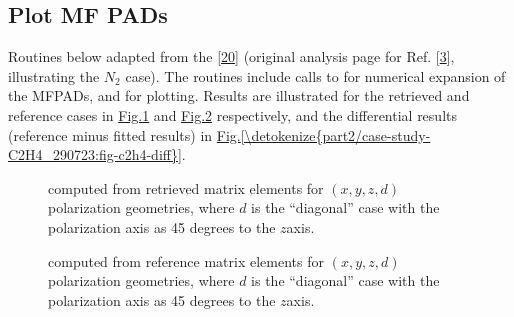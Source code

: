 \documentclass[letterpaper,table,10pt,english]{jupyterBook}
\begin{document}
\subsection{Plot MF PADs}
\label{\detokenize{part2/case-study-C2H4_290723:plot-mf-pads}}
\sphinxAtStartPar
Routines below adapted from the  {[}\hyperlink{cite.backmatter/bibliography:id681}{20}{]}  (original analysis page for Ref. {[}\hyperlink{cite.backmatter/bibliography:id686}{3}{]}, illustrating the \(N_2\) case). The routines include calls to  for numerical expansion of the MF\sphinxhyphen{}PADs, and  for plotting. Results are illustrated for the retrieved and reference cases in \hyperref[\detokenize{part2/case-study-C2H4_290723:fig-c2h4-compc}]{Fig.\@ \ref{\detokenize{part2/case-study-C2H4_290723:fig-c2h4-compc}}} and \hyperref[\detokenize{part2/case-study-C2H4_290723:fig-c2h4-ref}]{Fig.\@ \ref{\detokenize{part2/case-study-C2H4_290723:fig-c2h4-ref}}} respectively, and the differential results (reference minus fitted results) in \hyperref[\detokenize{part2/case-study-C2H4_290723:fig-c2h4-diff}]{Fig.\@ \ref{\detokenize{part2/case-study-C2H4_290723:fig-c2h4-diff}}}.

\begin{figure}[htbp]
\centering
\capstart

\noindent{}
\caption{{\hyperref[\detokenize{backmatter/glossary:term-MF}]{}} computed from retrieved matrix elements for \((x,y,z,d)\) polarization geometries, where \(d\) is the “diagonal” case with the polarization axis as 45 degrees to the \(z\)\sphinxhyphen{}axis.}\label{\detokenize{part2/case-study-C2H4_290723:fig-c2h4-compc}}\end{figure}

\begin{figure}[htbp]
\centering
\capstart

\noindent{}
\caption{{\hyperref[\detokenize{backmatter/glossary:term-MF}]{}} computed from reference  matrix elements for \((x,y,z,d)\) polarization geometries, where \(d\) is the “diagonal” case with the polarization axis as 45 degrees to the \(z\)\sphinxhyphen{}axis.}\label{\detokenize{part2/case-study-C2H4_290723:fig-c2h4-ref}}\end{figure}
\end{document}
